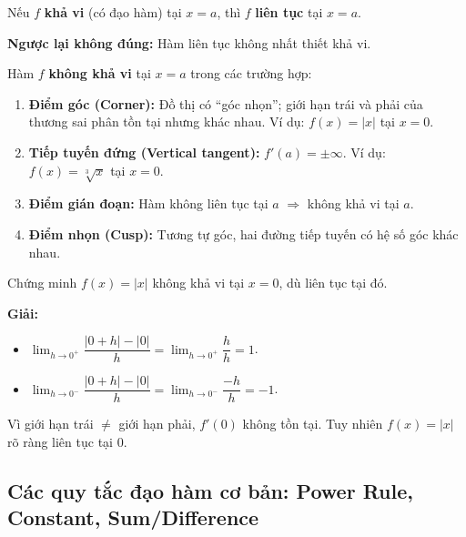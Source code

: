 \documentclass[12pt,a4paper]{article}
\begin{document}
\begin{dinhly}[title={Khả vi kéo theo liên tục}]
  Nếu $f$ \textbf{khả vi} (có đạo hàm) tại $x = a$, thì $f$ \textbf{liên tục} tại $x = a$.

  \medskip
  \textbf{Ngược lại không đúng:} Hàm liên tục không nhất thiết khả vi.
\end{dinhly}

\begin{dinhnghia}[title={Các trường hợp hàm không khả vi}]
  Hàm $f$ \textbf{không khả vi} tại $x = a$ trong các trường hợp:
  \begin{enumerate}
    \item \textbf{Điểm góc (Corner):} Đồ thị có ``góc nhọn''; giới hạn trái và phải của thương sai phân tồn tại nhưng khác nhau. Ví dụ: $f(x) = |x|$ tại $x = 0$.
    \item \textbf{Tiếp tuyến đứng (Vertical tangent):} $f'(a) = \pm\infty$. Ví dụ: $f(x) = \sqrt[3]{x}$ tại $x = 0$.
    \item \textbf{Điểm gián đoạn:} Hàm không liên tục tại $a$ $\Rightarrow$ không khả vi tại $a$.
    \item \textbf{Điểm nhọn (Cusp):} Tương tự góc, hai đường tiếp tuyến có hệ số góc khác nhau.
  \end{enumerate}
\end{dinhnghia}

\begin{vidu}
  Chứng minh $f(x) = |x|$ không khả vi tại $x = 0$, dù liên tục tại đó.

  \medskip\textbf{Giải:}
  \begin{itemize}
    \item $\displaystyle\lim_{h \to 0^+} \dfrac{|0+h| - |0|}{h} = \lim_{h \to 0^+} \dfrac{h}{h} = 1$.
    \item $\displaystyle\lim_{h \to 0^-} \dfrac{|0+h| - |0|}{h} = \lim_{h \to 0^-} \dfrac{-h}{h} = -1$.
  \end{itemize}
  Vì giới hạn trái $\ne$ giới hạn phải, $f'(0)$ không tồn tại. Tuy nhiên $f(x) = |x|$ rõ ràng liên tục tại $0$.
\end{vidu}

\subsection{Các quy tắc đạo hàm cơ bản: Power Rule, Constant, Sum/Difference}
\end{document}
